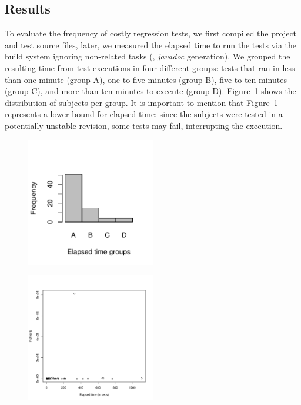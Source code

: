 \subsection{Results}
\label{sec:results}

\RQONE{} To evaluate the frequency of costly regression tests, we first compiled the
project and test source files, later, we measured the elapsed time to
run the tests via the build system ignoring non-related tasks (\eg,
\emph{javadoc} generation).  We grouped the resulting time from test
executions in four different groups: tests that ran in less than one
minute (group A), one to five minutes (group B), five to ten minutes
(group C), and more than ten minutes to execute (group D).
Figure~\ref{fig:timecost-barplot} shows the distribution of subjects
per group. It is important to mention that
Figure~\ref{fig:timecost-barplot} represents a lower bound for elapsed
time: since the subjects were tested in a potentially unstable
revision, some tests may fail, interrupting the execution.

\begin{figure}[t!]
    \centering
    \includegraphics[width=0.5\textwidth]{plots/timecost-barplot/timecost-barplot.pdf}
    \caption{\label{fig:timecost-barplot} }
\end{figure}

\begin{figure}[t!]
    \centering
    \includegraphics[width=0.5\textwidth]{plots/teststime-scatter/timetests-scatter.pdf}
    \caption{\label{fig:timetests-scatter} }
\end{figure}

\RQTWO{} 

\RQTHREE{} 

\RQFOUR{} 

\RQFIVE{} 
